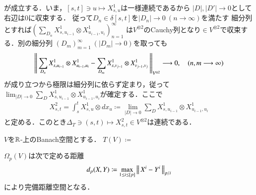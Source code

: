 	が成立する．いま，$[s,t] \ni u \longmapsto X^1_{s,u}$は一様連続であるから
	$|D|,|D'|\longrightarrow 0$として右辺は0に収束する．
	従って$D_n \in \delta[s,t]$を$|D_n| \longrightarrow 0\ (n \longrightarrow \infty)$を満たす
	細分列とすれば$\left(\sum_{D_n} X^1_{s,u_{i-1}} \otimes X^1_{u_{i-1},u_i} \right)_{n=1}^{\infty}$
	は$V^{\otimes 2}$のCauchy列となり$\in V^{\otimes 2}$で収束する．別の細分列
	$(D_m)_{m=1}^{\infty}\ (|D_m| \longrightarrow 0)$を取っても
	\begin{align}
		\left\|\,  \sum_{D_n} X^1_{s,u_{i-1}} \otimes X^1_{u_{i-1},u_i} - 
			\sum_{D_m} X^1_{s,v_{j-1}} \otimes X^1_{v_{j-1},v_j}\, \right\|_{V^{\otimes 2}}
		\longrightarrow 0,
		\quad (n,m \longrightarrow \infty)
	\end{align}
	が成り立つから極限は細分列に依らず定まり，従って
	$\lim_{|D| \to 0} \sum_{D} X^1_{s,u_{i-1}} \otimes X^1_{u_{i-1},u_i}$が確定する．ここで
	\begin{align}
		X^2_{s,t} = \int_s^t X^1_{s,u} \otimes d x_u \coloneqq 
		\lim_{|D| \to 0} \sum_{D} X^1_{s,u_{i-1}} \otimes X^1_{u_{i-1},u_i}
	\end{align}
	と定める．このとき$\Delta_T \ni (s,t) \longmapsto X^2_{s,t} \in V^{\otimes 2}$は連続である．
	

$V$を$\mathbb{R}$-上のBanach空間とする．
$T(V) \coloneqq $
\begin{screen}
	\begin{thm}
		$\Omega_p(V)$は次で定める距離
		\begin{align}
			d_p(X,Y) \coloneqq \operatorname*{max}_{1 \leq i \leq [p]} \left\|\, X^i - Y^i\, \right\|_{p/i}
		\end{align}
		により完備距離空間となる．
	\end{thm}
\end{screen}

